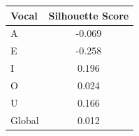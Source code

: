 \begin{tabular}{lc}
\toprule
\rowcolor{col01}
Vocal & Silhouette Score \\
\midrule
A & -0.069 \\
E & -0.258 \\
I & 0.196 \\
O & 0.024 \\
U & 0.166 \\
Global & 0.012 \\
\bottomrule
\end{tabular}
